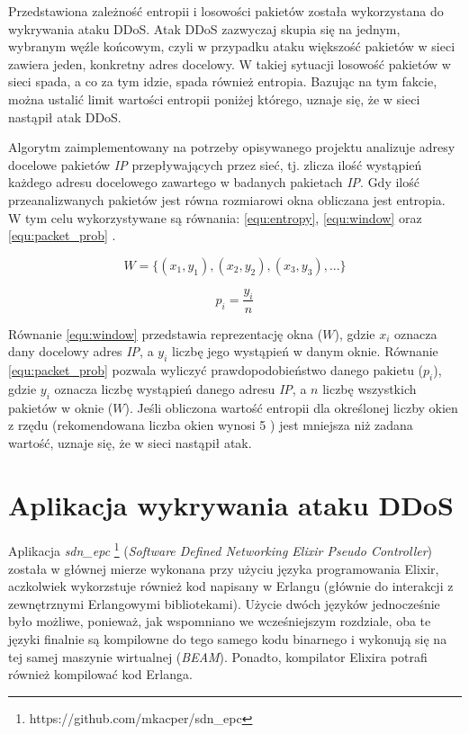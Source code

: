 Przedstawiona zależność entropii i losowości pakietów została wykorzystana do
wykrywania ataku DDoS. Atak DDoS zazwyczaj skupia się na jednym, wybranym węźle
końcowym, czyli w przypadku ataku większość pakietów w sieci zawiera jeden,
konkretny adres docelowy. W takiej sytuacji losowość pakietów w sieci spada, a
co za tym idzie, spada również entropia. Bazując na tym fakcie, można ustalić
limit wartości entropii poniżej którego, uznaje się, że w sieci nastąpił atak
DDoS. 

Algorytm zaimplementowany na potrzeby opisywanego projektu analizuje adresy
docelowe pakietów \textit{IP} przepływających przez sieć, tj. zlicza ilość
wystąpień każdego adresu docelowego zawartego w badanych pakietach \textit{IP}.
Gdy ilość przeanalizwanych pakietów jest równa rozmiarowi okna obliczana jest 
entropia. W tym celu wykorzystywane są równania: \ref{equ:entropy},
\ref{equ:window} \cite{mainddosarticle} oraz \ref{equ:packet_prob}
\cite{mainddosarticle}.

\begin{equation}
W = \{(x_{1},y_{1}),(x_{2},y_{2}),(x_{3},y_{3}),...\}
\label{equ:window}
\end{equation}

\begin{equation}
p_{i} = \frac{y_{i}}{n}
\label{equ:packet_prob}
\end{equation}

Równanie \ref{equ:window} przedstawia reprezentację okna ($W$), gdzie $x_{i}$
oznacza dany docelowy adres \textit{IP}, a $y_{i}$ liczbę jego wystąpień w danym
oknie. Równanie \ref{equ:packet_prob} pozwala wyliczyć prawdopodobieństwo
danego pakietu ($p_{i}$), gdzie $y_{i}$ oznacza liczbę wystąpień danego adresu
\textit{IP}, a $n$ liczbę wszystkich pakietów w oknie ($W$).
Jeśli obliczona wartość entropii dla określonej liczby okien z rzędu
(rekomendowana liczba okien  wynosi 5 \cite{mainddosarticle}) jest mniejsza niż
zadana wartość, uznaje się, że w sieci nastąpił atak. 

\section{Aplikacja wykrywania ataku DDoS}

Aplikacja \textit{sdn\_epc} \footnote{https://github.com/mkacper/sdn\_epc}
(\textit{Software Defined Networking Elixir Pseudo Controller}) została w
głównej mierze wykonana przy użyciu języka programowania Elixir, aczkolwiek
wykorzstuje również kod napisany w Erlangu (głównie do interakcji z zewnętrznymi
Erlangowymi bibliotekami). Użycie dwóch języków jednocześnie było możliwe,
ponieważ, jak wspomniano we wcześniejszym rozdziale, oba te języki finalnie są
kompilowne do tego samego kodu binarnego i wykonują się na tej samej maszynie
wirtualnej (\textit{BEAM}). Ponadto, kompilator Elixira potrafi również
kompilować kod Erlanga.

